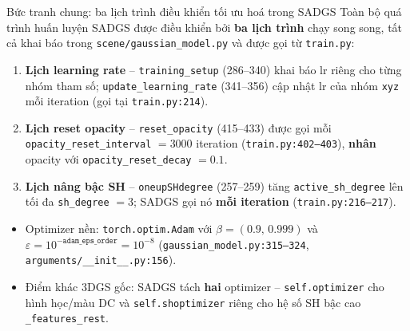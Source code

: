 
\begin{frame}{Bức tranh chung: ba lịch trình điều khiển tối ưu hoá trong SADGS}
\footnotesize
Toàn bộ quá trình huấn luyện SADGS được điều khiển bởi \textbf{ba lịch trình} chạy song song, tất cả khai báo trong \texttt{scene/gaussian\_model.py} và được gọi từ \texttt{train.py}:
\begin{enumerate}
    \item \textbf{Lịch learning rate} -- \texttt{training\_setup} (286--340) khai báo lr riêng cho từng nhóm tham số; \texttt{update\_learning\_rate} (341--356) cập nhật lr của nhóm \texttt{xyz} mỗi iteration (gọi tại \texttt{train.py:214}).
    \item \textbf{Lịch reset opacity} -- \texttt{reset\_opacity} (415--433) được gọi mỗi \texttt{opacity\_reset\_interval} $=3000$ iteration (\texttt{train.py:402--403}), \textbf{nhân} opacity với \texttt{opacity\_reset\_decay} $=0.1$.
    \item \textbf{Lịch nâng bậc SH} -- \texttt{oneupSHdegree} (257--259) tăng \texttt{active\_sh\_degree} lên tối đa \texttt{sh\_degree} $=3$; SADGS gọi nó \textbf{mỗi iteration} (\texttt{train.py:216--217}).
\end{enumerate}
\vspace{0.15cm}
\begin{itemize}
    \item Optimizer nền: \texttt{torch.optim.Adam} với $\beta=(0.9,\,0.999)$ và $\varepsilon = 10^{-\texttt{adam\_eps\_order}} = 10^{-8}$ (\texttt{gaussian\_model.py:315--324}, \texttt{arguments/\_\_init\_\_.py:156}).
    \item Điểm khác 3DGS gốc: SADGS tách \textbf{hai} optimizer -- \texttt{self.optimizer} cho hình học/màu DC và \texttt{self.shoptimizer} riêng cho hệ số SH bậc cao \texttt{\_features\_rest}.
\end{itemize}
\end{frame}

